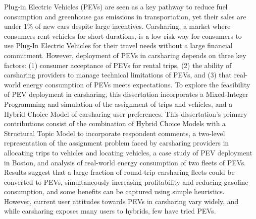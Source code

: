 Plug-in Electric Vehicles (PEVs) are seen as a key pathway to reduce fuel consumption and greenhouse gas emissions in transportation, yet their sales are under 1\% of new cars despite large incentives. Carsharing, a market where consumers rent vehicles for short durations, is a low-risk way for consumers to use Plug-In Electric Vehicles for their travel needs without a large financial commitment. However, deployment of PEVs in carsharing depends on three key factors: (1) consumer acceptance of PEVs for rental trips, (2) the ability of carsharing providers to manage technical limitations of PEVs, and (3) that real-world energy consumption of PEVs meets expectations. To explore the feasibility of PEV deployment in carsharing, this dissertation incorporates a Mixed-Integer Programming and simulation of the assignment of trips and vehicles, and a Hybrid Choice Model of carsharing user preferences. This dissertation's primary contributions consist of the combination of Hybrid Choice Models with a Structural Topic Model to incorporate respondent comments, a two-level representation of the assignment problem faced by carsharing providers in allocating trips to vehicles and locating vehicles, a case study of PEV deployment in Boston, and analysis of real-world energy consumption of two fleets of PEVs. Results suggest that a large fraction of round-trip carsharing fleets could be converted to PEVs, simultaneously increasing profitability and reducing gasoline consumption, and some benefits can be captured using simple heuristics. However, current user attitudes towards PEVs in carsharing vary widely, and while carsharing exposes many users to hybrids, few have tried PEVs.
